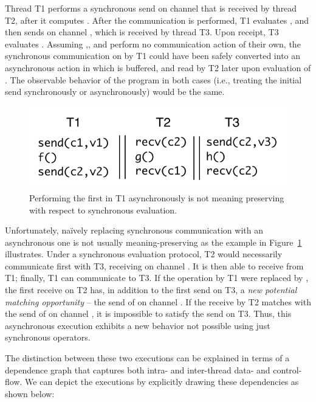 \noindent Thread T1 performs a synchronous send on channel  that is
received by thread T2, after it computes .  After the communication is
performed, T1 evaluates , and then sends  on channel ,
which is received by thread T3.  Upon receipt, T3 evaluates . Assuming
,, and  perform no communication action of their own, the
synchronous communication on  by T1 could have been safely converted
into an asynchronous action in which  is buffered, and read by T2 later
upon evaluation of .  The observable behavior of the program in both
cases (i.e., treating the initial send synchronously or asynchronously) would
be the same.

\begin{figure}[b]
\centering
\includegraphics{Figures/IntroCode2}
\caption{Performing the first  in T1 asynchronously is not meaning
preserving with respect to synchronous evaluation.}
\label{fig:intro2}
\end{figure}

Unfortunately, na\"{i}vely replacing synchronous communication with an
asynchronous one is not usually meaning-preserving as the example in
Figure~\ref{fig:intro2} illustrates. Under a synchronous evaluation protocol,
T2 would necessarily communicate first with T3, receiving  on channel
.  It is then able to receive  from T1; finally, T1 can
communicate  to T3.  If the  operation by T1 were
replaced by , the first receive on T2 has, in addition to the
first send on T3, a \emph{new potential matching opportunity} -- the send of
 on channel . If the receive by T2 matches with the send of
 on channel , it is impossible to satisfy the send on T3. Thus,
this asynchronous execution exhibits a new behavior not possible using just
synchronous operators.

The distinction between these two executions can be explained in terms of a
dependence graph that captures both intra- and inter-thread data- and
control-flow.  We can depict the executions by explicitly drawing these
dependencies as shown below:

